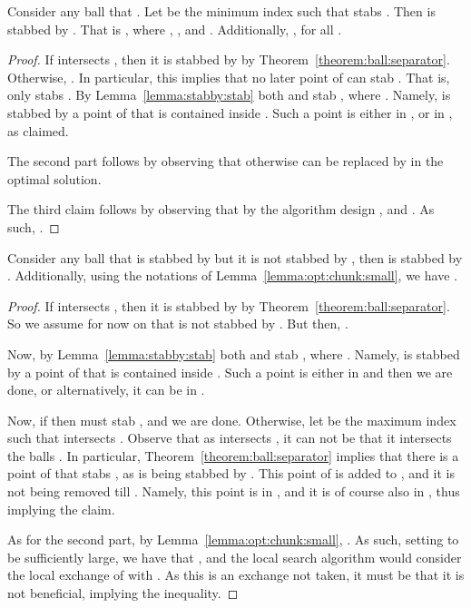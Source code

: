 \InSubmitVer{\documentclass[11pt]{article}}
\numberwithin{figure}{section}
\numberwithin{table}{section}
\numberwithin{equation}{section}
\newcommand{\lemlab}[1]{\label{lemma:#1}}
\newcommand{\lemref}[1]{Lemma~\ref{lemma:#1}}
\newcommand{\thmrefpage}[1]{Theorem~\ref{theorem:#1}}
\begin{document}
\begin{lemma}
    \lemlab{opt:chunk:small}Consider any ball that . Let  be the
    minimum index such that  stabs . Then  is
    stabbed by . That is , where
    , , and . Additionally, , for
    all .
\end{lemma}
\begin{proof}
    If  intersects , then it is stabbed by
     by \thmrefpage{ball:separator}. Otherwise, . In particular, this implies that no later point of
     can stab . That is,
    only  stabs .  By \lemref{stabby:stab} both
     and  stab , where . Namely,  is stabbed by a
    point of  that is contained inside . Such a point is
    either in , or in , as
    claimed.

    The second part follows by observing that otherwise  can
    be replaced by  in the optimal solution.

    The third claim follows by observing that by the algorithm design
    , and . As such,
    .
\end{proof}


\begin{lemma}
    \lemlab{local:is:small}Consider any ball  that is stabbed by
     but it is not stabbed by , then
     is stabbed by . Additionally, using the notations of
    \lemref{opt:chunk:small}, we have .
\end{lemma}
\begin{proof}
    If  intersects , then it is stabbed by
     by \thmrefpage{ball:separator}.  So we assume for
    now on that  is not stabbed by .  But then,
    . 


    Now, by \lemref{stabby:stab} both  and  stab
    , where . Namely,
     is stabbed by a point of  that is contained inside
    . Such a point is either in 
    and then we are done, or alternatively, it can be in
    .

    Now, if  then  must stab
    , and we are done. Otherwise, let  be the maximum
    index such that  intersects . Observe
    that as  intersects , it can not be that it
    intersects the balls . In
    particular, \thmrefpage{ball:separator} implies that there is a
    point of  that stabs , as  is being
    stabbed by . This point of 
    is added to , and it is not being removed till
    . Namely, this point is in , and it is
    of course also in , thus implying the claim.

    As for the second part, by \lemref{opt:chunk:small}, . As such, setting  to be sufficiently large, we have that , and the local search algorithm would consider the local
    exchange of  with . As this is an exchange not taken, it
    must be that it is not beneficial, implying the inequality.
\end{proof}
\end{document}
